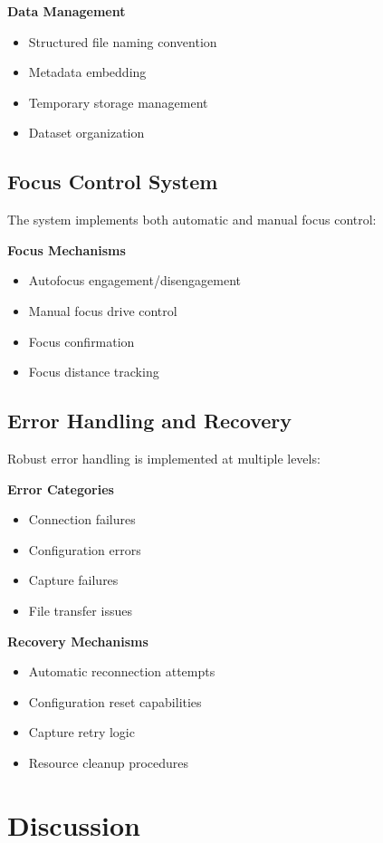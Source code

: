 \textbf{Data Management}
\begin{itemize}
    \item Structured file naming convention
    \item Metadata embedding
    \item Temporary storage management
    \item Dataset organization
\end{itemize}

\subsection{Focus Control System}
The system implements both automatic and manual focus control:

\textbf{Focus Mechanisms}
\begin{itemize}
    \item Autofocus engagement/disengagement
    \item Manual focus drive control
    \item Focus confirmation
    \item Focus distance tracking
\end{itemize}

\subsection{Error Handling and Recovery}
Robust error handling is implemented at multiple levels:

\textbf{Error Categories}
\begin{itemize}
    \item Connection failures
    \item Configuration errors
    \item Capture failures
    \item File transfer issues
\end{itemize}

\textbf{Recovery Mechanisms}
\begin{itemize}
    \item Automatic reconnection attempts
    \item Configuration reset capabilities
    \item Capture retry logic
    \item Resource cleanup procedures
\end{itemize}

\section{Discussion}

